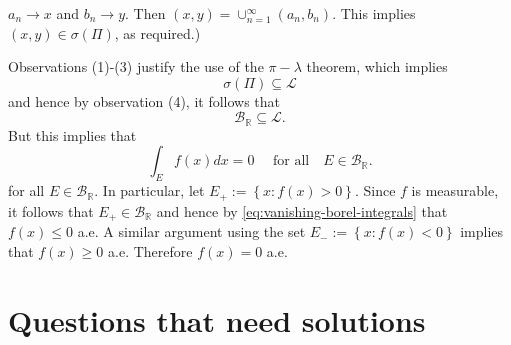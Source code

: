 \documentclass[answers]{exam}
\theoremstyle{problemstyle}
\newcommand{\1}[1]{\textbf{1}_{\left[#1\right]}} %
\begin{document}
\begin{questions}
\begin{solution}
\begin{enumerate}
  $a_{n}\to x$ and $b_{n}\to y$. Then $(x,y)= \cup_{n=1}^{\infty}(a_{n},b_{n})$.
  This implies $(x,y)\in \sigma(\Pi)$, as required.)
\end{enumerate}
Observations (1)-(3) justify the use of the $\pi-\lambda$ theorem, which implies
\begin{equation*}
  \sigma(\Pi)\subseteq \mathcal{L}
\end{equation*}
and hence by observation (4), it follows that
\begin{equation*}
  \mathcal{B}_{\mathbb{R}}\subseteq  \mathcal{L}.
\end{equation*}
But this implies that
\begin{equation}\label{eq:vanishing-borel-integrals}
  \int_{E}f(x)dx = 0 \quad\text{ for all}\quad E\in \mathcal{B}_{\mathbb{R}}.
\end{equation}
for all $E\in \mathcal{B}_{\mathbb{R}}$. In particular, let $E_{+}:= \left\{x:
  f(x)>0\right\}$. Since $f$ is measurable, it follows that $E_{+}\in \mathcal{B}_{\mathbb{R}}$
and hence by \eqref{eq:vanishing-borel-integrals} that $f(x)\leq 0$ a.e. A
similar argument using the set $E_{-}:= \left\{x: f(x)<0\right\}$ implies that
$f(x)\geq 0$ a.e. Therefore $f(x)=0$ a.e.
\end{solution}










\newpage
\section{Questions that need solutions}


\end{questions}
\end{document}
